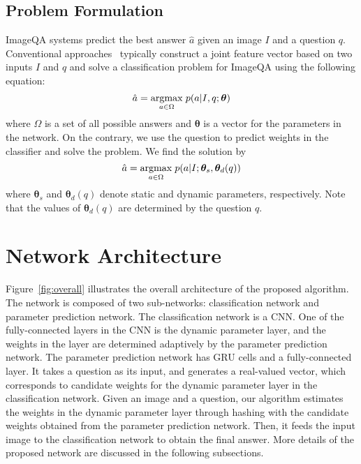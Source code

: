 \documentclass[10pt,twocolumn,letterpaper]{article}
\begin{document}
\subsection{Problem Formulation}


ImageQA systems predict the best answer $\hat{a}$ given an image $I$ and a question $q$.
Conventional approaches~\cite{Convqa, mren2015} typically construct a joint feature vector based on two inputs $I$ and $q$ and solve a classification problem for ImageQA using the following equation:
\begin{equation}
\hat{a} = \underset{a\in{\Omega}}{\operatorname{argmax}} \hspace{0.1cm} p(a \vert {I}, q;{\bm{\theta}})
\end{equation}
where $\Omega$ is a set of all possible answers and ${\bm{\theta}}$ is a vector for the parameters in the network. 
On the contrary, we use the question to predict weights in the classifier and solve the problem.
We find the solution by 
\begin{equation}
\hat{a} = \underset{a\in{\Omega}}{\operatorname{argmax}} \hspace{0.1cm} p(a \vert I ;{\bm{\theta}}_{s},{\bm{\theta}}_{d} (q))
\end{equation}
where ${\bm{\theta}}_{s}$ and ${\bm{\theta}}_{d}(q)$ denote static and dynamic parameters, respectively.
Note that the values of ${\bm{\theta}}_{d}(q)$ are determined by the question $q$.



\section{Network Architecture}
\label{sec:architecture}


Figure~\ref{fig:overall} illustrates the overall architecture of the proposed algorithm.
The network is composed of two sub-networks: classification network and parameter prediction network.
The classification network is a CNN.
One of the fully-connected layers in the CNN is the dynamic parameter layer, and the weights in the layer are determined adaptively by the parameter prediction network.
The parameter prediction network has GRU cells and a fully-connected layer.
It takes a question as its input, and generates a real-valued vector, which corresponds to candidate weights for the dynamic parameter layer in the classification network.
Given an image and a question, our algorithm estimates the weights in the dynamic parameter layer through hashing with the candidate weights obtained from the parameter prediction network.
Then, it feeds the input image to the classification network to obtain the final answer.
More details of the proposed network are discussed in the following subsections.
\end{document}
